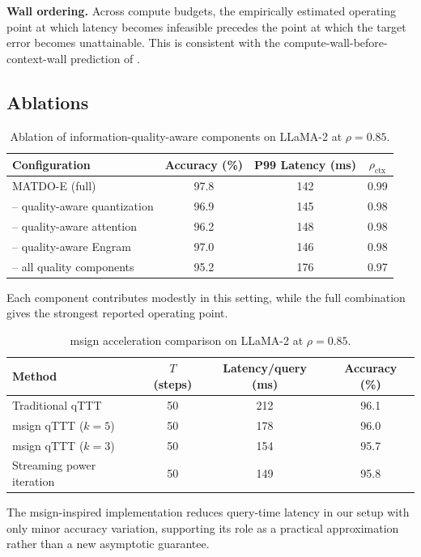 \documentclass[11pt,a4paper]{article}
\theoremstyle{plain}
\theoremstyle{definition}
\begin{document}
\textbf{Wall ordering.} Across compute budgets, the empirically estimated operating point at which latency becomes infeasible precedes the point at which the target error becomes unattainable. This is consistent with the compute-wall-before-context-wall prediction of .

\subsection{Ablations}
\begin{table}[h]
\centering
\caption{Ablation of information-quality-aware components on LLaMA-2 at $\rho=0.85$.}
\label{tab:quality}
\begin{tabular}{@{}lccc@{}}
\toprule
Configuration & Accuracy (\%) & P99 Latency (ms) & $\rho_{\text{ctx}}$ \\
\midrule
MATDO-E (full) & 97.8 & 142 & 0.99 \\
-- quality-aware quantization & 96.9 & 145 & 0.98 \\
-- quality-aware attention & 96.2 & 148 & 0.98 \\
-- quality-aware Engram & 97.0 & 146 & 0.98 \\
-- all quality components & 95.2 & 176 & 0.97 \\
\bottomrule
\end{tabular}
\end{table}

Each component contributes modestly in this setting, while the full combination gives the strongest reported operating point.

\begin{table}[h]
\centering
\caption{msign acceleration comparison on LLaMA-2 at $\rho=0.85$.}
\label{tab:msign}
\begin{tabular}{@{}lccc@{}}
\toprule
Method & $T$ (steps) & Latency/query (ms) & Accuracy (\%) \\
\midrule
Traditional qTTT & 50 & 212 & 96.1 \\
msign qTTT ($k=5$) & 50 & 178 & 96.0 \\
msign qTTT ($k=3$) & 50 & 154 & 95.7 \\
Streaming power iteration & 50 & 149 & 95.8 \\
\bottomrule
\end{tabular}
\end{table}

The msign-inspired implementation reduces query-time latency in our setup with only minor accuracy variation, supporting its role as a practical approximation rather than a new asymptotic guarantee.
\end{document}
